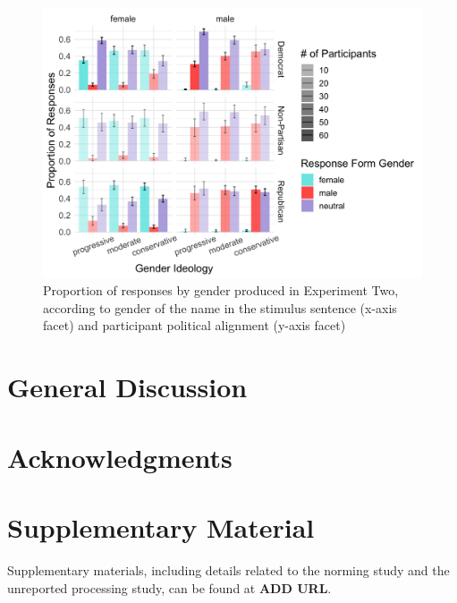 \documentclass[10pt,letterpaper]{article}
\begin{document}
	\begin{figure}[h]
		\includegraphics[scale=0.115]{prod-3x2x3.png}
		\caption{Proportion of responses by gender produced in Experiment Two, according to gender of the name in the stimulus sentence (x-axis facet) and participant political alignment (y-axis facet)}
	\end{figure}
	
	\section{General Discussion}
	
	\section{Acknowledgments}
	
	\section{Supplementary Material}
	Supplementary materials, including details related to the norming study and the unreported processing study, can be found at \textbf{ADD URL}.
	
	
	\printbibliography
	
	
	
\end{document}

